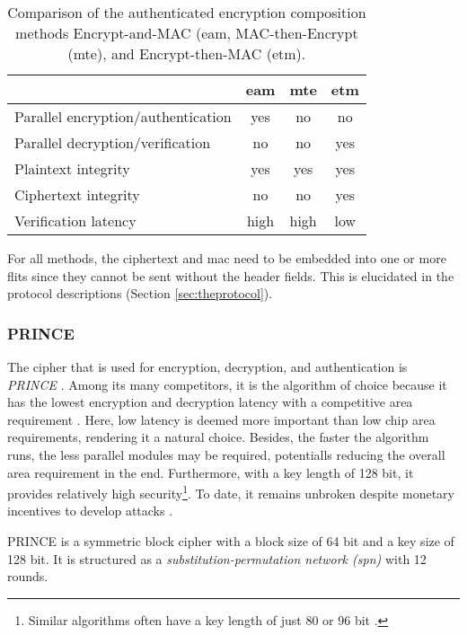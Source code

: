 \begin{table}
    \centering
    \begin{tabulary}{\textwidth}{L|CCC}
        & \gls{eam} & \gls{mte} & \gls{etm} \\\hline
        Parallel encryption/authentication & yes & no & no \\
        Parallel decryption/verification & no & no & yes \\
        Plaintext integrity & yes & yes & yes \\
        Ciphertext integrity & no & no & yes \\ %
        Verification latency & high & high & low
    \end{tabulary}
    \caption[Comparison of authenticated encryption composition methods]{Comparison of the authenticated encryption composition methods
    Encrypt-and-MAC (\gls{eam}, MAC-then-Encrypt (\gls{mte}), and Encrypt-then-MAC (\gls{etm}).}
    \label{tab:compositionmethods}
\end{table}

For all methods, the ciphertext and \gls{mac} need to be embedded into one or more flits since they cannot be sent without the header fields. This is
elucidated in the protocol descriptions (Section \ref{sec:theprotocol}).

\subsubsection{PRINCE}\label{subsubsec:prince}
The cipher that is used for encryption, decryption, and authentication is \textit{PRINCE} \cite{borghoff12prince}. Among its many competitors, it is
the algorithm of choice because it has the lowest encryption and decryption latency with a competitive area requirement
\cite{harttung17lightweightcrypto}. Here, low latency is deemed more important than low chip area requirements, rendering it a natural choice. Besides, the
faster the algorithm runs, the less parallel modules may be required, potentialls reducing the overall area requirement in the end. Furthermore, with a
key length of 128 bit, it provides relatively high security\footnote{Similar algorithms often have a key length of just 80 or 96 bit
\cite[5]{harttung17lightweightcrypto}.}. To date, it remains unbroken despite monetary incentives to develop attacks \cite{princechallenge}.

PRINCE is a symmetric block cipher with a block size of 64 bit and a key size of 128 bit. It is structured as a \textit{substitution-permutation
network (\gls{spn})} with 12 rounds.

